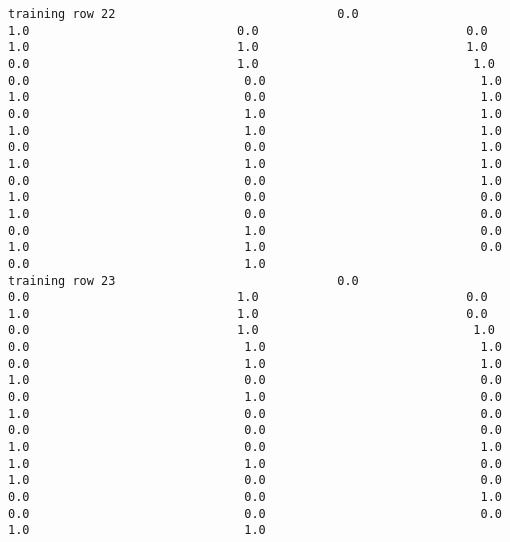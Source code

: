 \documentclass[11pt]{article}
\begin{document}
\begin{verbatim}
training row 22                               0.0                             1.0                             0.0                             0.0                             1.0                             1.0                             1.0                             0.0                             1.0                              1.0                              0.0                              0.0                              1.0                              1.0                              0.0                              1.0                              0.0                              1.0                              1.0                              1.0                              1.0                              1.0                              0.0                              0.0                              1.0                              1.0                              1.0                              1.0                              0.0                              0.0                              1.0                              1.0                              0.0                              0.0                              1.0                              0.0                              0.0                              0.0                              1.0                              0.0                              1.0                              1.0                              0.0                              0.0                              1.0
training row 23                               0.0                             0.0                             1.0                             0.0                             1.0                             1.0                             0.0                             0.0                             1.0                              1.0                              0.0                              1.0                              1.0                              0.0                              1.0                              1.0                              1.0                              0.0                              0.0                              0.0                              1.0                              0.0                              1.0                              0.0                              0.0                              0.0                              0.0                              0.0                              1.0                              0.0                              1.0                              1.0                              1.0                              0.0                              1.0                              0.0                              0.0                              0.0                              0.0                              1.0                              0.0                              0.0                              0.0                              1.0                              1.0

\end{verbatim}
\end{document}
